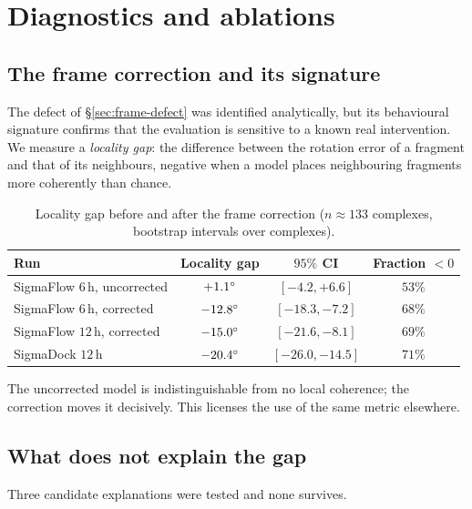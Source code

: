 \section{Diagnostics and ablations}
\label{sec:diagnostics}

\subsection{The frame correction and its signature}

The defect of \S\ref{sec:frame-defect} was identified analytically, but its
behavioural signature confirms that the evaluation is sensitive to a known
real intervention. We measure a \emph{locality gap}: the difference between
the rotation error of a fragment and that of its neighbours, negative when a
model places neighbouring fragments more coherently than chance.

\begin{table}[htbp]
\centering
\caption{Locality gap before and after the frame correction
($n \approx 133$ complexes, bootstrap intervals over complexes).}
\label{tab:framefix}
\small
\begin{tabular}{@{}lccc@{}}
\toprule
Run & Locality gap & $95\%$ CI & Fraction $<0$ \\
\midrule
SigmaFlow $6$\,h, uncorrected & $+1.1^{\circ}$  & $[-4.2, +6.6]$   & $53\%$ \\
SigmaFlow $6$\,h, corrected   & $-12.8^{\circ}$ & $[-18.3, -7.2]$  & $68\%$ \\
SigmaFlow $12$\,h, corrected  & $-15.0^{\circ}$ & $[-21.6, -8.1]$  & $69\%$ \\
SigmaDock $12$\,h             & $-20.4^{\circ}$ & $[-26.0, -14.5]$ & $71\%$ \\
\bottomrule
\end{tabular}
\end{table}

The uncorrected model is indistinguishable from no local coherence; the
correction moves it decisively. This licenses the use of the same metric
elsewhere.

\subsection{What does not explain the gap}
\label{sec:excluded}

Three candidate explanations were tested and none survives.

